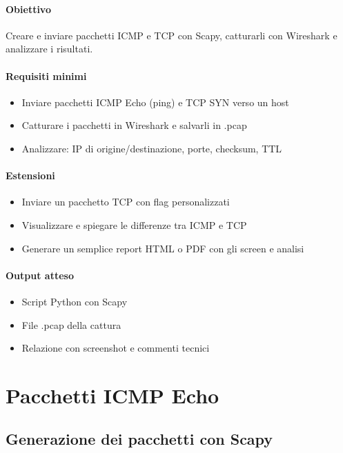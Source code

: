 \documentclass[12pt,a4paper]{report}
\begin{document}
\subsubsection{Obiettivo}
Creare e inviare pacchetti ICMP e TCP con Scapy, catturarli con Wireshark e analizzare i risultati.

\subsubsection{Requisiti minimi}
\begin{itemize}
	\item Inviare pacchetti ICMP Echo (ping) e TCP SYN verso un host
	\item Catturare i pacchetti in Wireshark e salvarli in .pcap
	\item Analizzare: IP di origine/destinazione, porte, checksum, TTL
\end{itemize}

\subsubsection{Estensioni}
\begin{itemize}
	\item Inviare un pacchetto TCP con flag personalizzati
	\item Visualizzare e spiegare le differenze tra ICMP e TCP
	\item Generare un semplice report HTML o PDF con gli screen e analisi
\end{itemize}

\subsubsection{Output atteso}

\begin{itemize}
	\item Script Python con Scapy
	\item File .pcap della cattura
	\item Relazione con screenshot e commenti tecnici
\end{itemize}

\chapter{Pacchetti ICMP Echo}

\section{Generazione dei pacchetti con Scapy}
\end{document}
